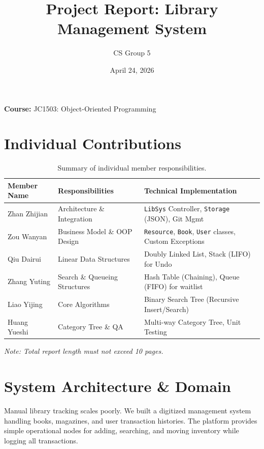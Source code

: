 \documentclass[11pt,a4paper]{article}
\title{Project Report: Library Management System}
\author{CS Group 5}
\date{April 24, 2026}
\begin{document}
\maketitle
\noindent\textbf{Course:} JC1503: Object-Oriented Programming

\section*{Individual Contributions}
\begin{table}[h]
    \centering
    \small
    \begin{tabular}{>{\raggedright\arraybackslash}p{3.1cm} >{\raggedright\arraybackslash}p{5.1cm} >{\raggedright\arraybackslash}p{6.2cm}}
        \toprule
        \textbf{Member Name} & \textbf{Responsibilities} & \textbf{Technical Implementation} \\
        \midrule
        Zhan Zhijian & Architecture \& Integration & \texttt{LibSys} Controller, \texttt{Storage} (JSON), Git Mgmt \\
        Zou Wanyan & Business Model \& OOP Design & \texttt{Resource}, \texttt{Book}, \texttt{User} classes, Custom Exceptions \\
        Qiu Dairui & Linear Data Structures & Doubly Linked List, Stack (LIFO) for Undo \\
        Zhang Yuting & Search \& Queueing Structures & Hash Table (Chaining), Queue (FIFO) for waitlist \\
        Liao Yijing & Core Algorithms & Binary Search Tree (Recursive Insert/Search) \\
        Huang Yueshi & Category Tree \& QA & Multi-way Category Tree, Unit Testing \\
        \bottomrule
    \end{tabular}
    \caption{Summary of individual member responsibilities.}
\end{table}

\vfill
\begin{center}
    \textit{Note: Total report length must not exceed 10 pages.}
\end{center}

\newpage

\section{System Architecture \& Domain}
Manual library tracking scales poorly. We built a digitized management system handling books, magazines, and user transaction histories. The platform provides simple operational nodes for adding, searching, and moving inventory while logging all transactions.
\end{document}
